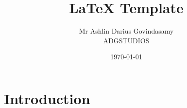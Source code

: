 \documentclass{report}
\title{LaTeX Template}
\author{Mr Ashlin Darius Govindasamy\\ \large{ADGSTUDIOS}}
\date{\today}
\begin{document}
\maketitle
\newpage

\tableofcontents


\chapter{Introduction}


\newpage
\end{document}
